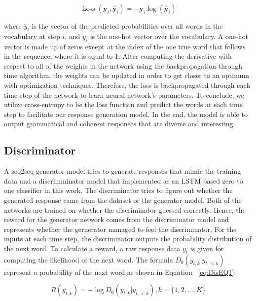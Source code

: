 {{\begin{equation}
    \operatorname{Loss}\left(\boldsymbol{y}_{i}, \hat{\boldsymbol{y}}_{i}\right)=-\boldsymbol{y}_{i} \log \left(\hat{\boldsymbol{y}}_{i}\right)
\end{equation}


where $\hat{y}_{i}$ is the vector of the predicted probabilities over all words in the vocabulary at step $i$, and $y_{i}$ is the one-hot vector over the vocabulary. A one-hot vector is made up of zeros except at the index of the one true word that follows in the sequence, where it is equal to 1. After computing the derivative with respect to all of the weights in the network using the backpropagation through time algorithm, the weights can be updated in order to get closer to an optimum with optimization techniques. Therefore, the loss is backpropagated through each time-step of the network to learn neural network's parameters. To conclude, we utilize cross-entropy \cite{Rubinstein:2004:CEM:1014902} to be the loss function and predict the words at each time step to facilitate our response generation model. In the end, the model is able to output grammatical and coherent responses that are diverse and interesting. 
}}
\subsection{Discriminator}

A seq2seq generator model tries to generate responses that mimic the training data and a discrimminator model that implemented as an LSTM based zero to one classifier in this work. The discriminator tries to figure out whether the generated response came from the dataset or the generator model. Both of the networks are trained on whether the discriminator guessed correctly. Hence, the reward for the generator network comes from the discriminator model and represents whether the gernerator managed to feel the discriminator. For the inputs at each time step, the discriminator outputs the probability distribution of the next word. To calculate a reward,  a raw response data $y_{t}$ is given  for computing  the likelihood of the next word. The formula $D_{\emptyset}\left(y_{t, k} | y_{t,<k}\right)$ represent a probability of the next word as shown in Equation ~\ref{eq:DisEQ1}:

\begin{equation} \label{eq:DisEQ1}
R\left(y_{t, k}\right)=-\log D_{\emptyset}\left(y_{t, k} | y_{t,<k}\right), k=\{1,2, \ldots, K\}
\end{equation}

